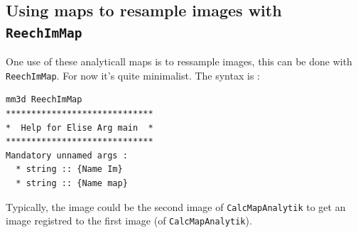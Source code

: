 
\subsection{Using maps to resample images with {\tt ReechImMap}}

One use of these analyticall maps is to ressample images,
this can be done with {\tt  ReechImMap}. For now it's quite minimalist. 
The syntax is :

\begin{verbatim}
mm3d ReechImMap
*****************************
*  Help for Elise Arg main  *
*****************************
Mandatory unnamed args : 
  * string :: {Name Im}
  * string :: {Name map}
\end{verbatim}

Typically, the image could be the second image of {\tt CalcMapAnalytik} 
to get an image registred to the first image (of {\tt CalcMapAnalytik}).





